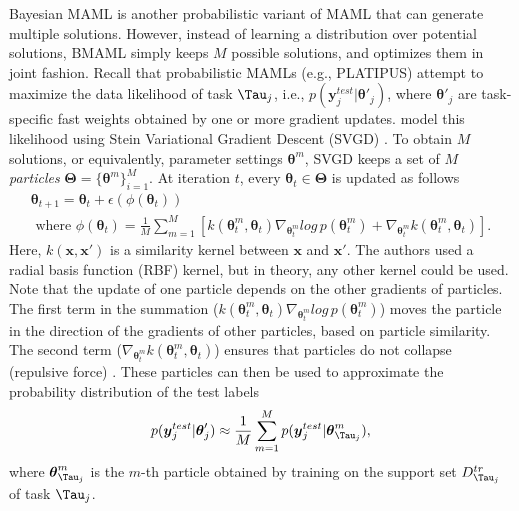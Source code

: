 Bayesian MAML  is another probabilistic variant of MAML that can generate multiple solutions. However, instead of learning a distribution over potential solutions, BMAML simply keeps $M$ possible solutions, and optimizes them in joint fashion. Recall that probabilistic MAMLs (e.g., PLATIPUS) attempt to maximize the data likelihood of task $\Tau_{j}$, i.e., $p(\boldsymbol{y}^{test}_{j}| \boldsymbol{\theta}'_{j})$, where $\boldsymbol{\theta}'_{j}$ are task-specific fast weights obtained by one or more gradient updates.  model this likelihood using Stein Variational Gradient Descent (SVGD) . 
To obtain $M$ solutions, or equivalently, parameter settings $\boldsymbol{\theta}^{m}$, SVGD keeps a set of $M$ \textit{particles} $\boldsymbol{\Theta} = \{ \boldsymbol{\theta}^{m} \}_{i=1}^{M}$. At iteration $t$, every $\boldsymbol{\theta}_{t} \in \boldsymbol{\Theta}$ is updated as follows
\begin{align}
    \boldsymbol{\theta}_{t+1} = \boldsymbol{\theta}_{t} + \epsilon (\phi (\boldsymbol{\theta}_{t})) \\ \text{ where } \phi(\boldsymbol{\theta}_{t}) = \frac{1}{M}\sum_{m=1}^{M} \left[ k(\boldsymbol{\theta}^{m}_{t}, \boldsymbol{\theta}_{t}) \nabla_{\boldsymbol{\theta}^{m}_{t}} log \, p(\boldsymbol{\theta}_{t}^{m}) + \nabla_{\boldsymbol{\theta}_{t}^{m}}k(\boldsymbol{\theta}^{m}_{t}, \boldsymbol{\theta}_{t}) \right]. 
\end{align} Here, $k(\boldsymbol{x}, \boldsymbol{x}')$ is a similarity kernel between $\boldsymbol{x}$ and $\boldsymbol{x}'$. The authors used a radial basis function (RBF) kernel, but in theory, any other kernel could be used. Note that the update of one particle depends on the other gradients of particles. The first term in the summation ($k(\boldsymbol{\theta}^{m}_{t}, \boldsymbol{\theta}_{t}) \nabla_{\boldsymbol{\theta}^{m}_{t}} log \, p(\boldsymbol{\theta}_{t}^{m})$) moves the particle in the direction of the gradients of other particles, based on particle similarity. The second term ($\nabla_{\boldsymbol{\theta}_{t}^{m}}k(\boldsymbol{\theta}^{m}_{t}, \boldsymbol{\theta}_{t})$) ensures that particles do not collapse (repulsive force) . 
These particles can then be used to approximate the probability distribution of the test labels
\begin{align}
    p(\boldsymbol{y}^{test}_{j}| \boldsymbol{\theta}'_{j}) \approx \frac{1}{M} \sum_{m=1}^{M} p(\boldsymbol{y}_{j}^{test} | \boldsymbol{\theta}^{m}_{\Tau_{j}}),
\end{align} where $\boldsymbol{\theta}_{\Tau_{j}}^{m}$ is the $m$-th particle obtained by training on the support set $D^{tr}_{\Tau_j}$ of task $\Tau_{j}$.
